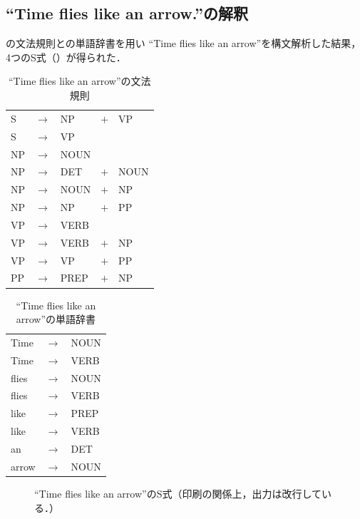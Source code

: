 \documentclass[uplatex, dvipdfmx, a4paper, twocolumn]{jsarticle}
\begin{document}
    \subsection{``Time flies like an arrow.''の解釈}
    の文法規則との単語辞書を用い
    ``Time flies like an arrow''を構文解析した結果，4つのS式（）が得られた．
    \begin{table}[htb]
      \centering
      \caption{``Time flies like an arrow''の文法規則}
      \label{tab:syntax_flies}
      \begin{tabular}{l c l c l} \hline
        S & $\to$ & NP & $+$ & VP \\
        S & $\to$ & VP & & \\
        NP & $\to$ & NOUN & & \\
        NP & $\to$ & DET & $+$ & NOUN \\
        NP & $\to$ & NOUN & $+$ & NP \\
        NP & $\to$ & NP & $+$ & PP \\
        VP & $\to$ & VERB & & \\
        VP & $\to$ & VERB & $+$ & NP \\
        VP & $\to$ & VP & $+$ & PP \\
        PP & $\to$ & PREP & $+$ & NP \\ \hline
      \end{tabular}
    \end{table}
    \begin{table}[htb]
      \centering
      \caption{``Time flies like an arrow''の単語辞書}
      \label{tab:dict_flies}
      \begin{tabular}{l c l} \hline
        Time & $\to$ & NOUN \\
        Time & $\to$ & VERB \\
        flies & $\to$ & NOUN \\
        flies & $\to$ & VERB \\
        like & $\to$ & PREP \\
        like & $\to$ & VERB \\
        an & $\to$ & DET \\
        arrow & $\to$ & NOUN \\ \hline
      \end{tabular}
    \end{table}
    \begin{figure}[htpb]
      \centering
      \caption{``Time flies like an arrow''のS式（印刷の関係上，出力は改行している．）}
      \label{fig:result_flies}
    \end{figure}
\end{document}
